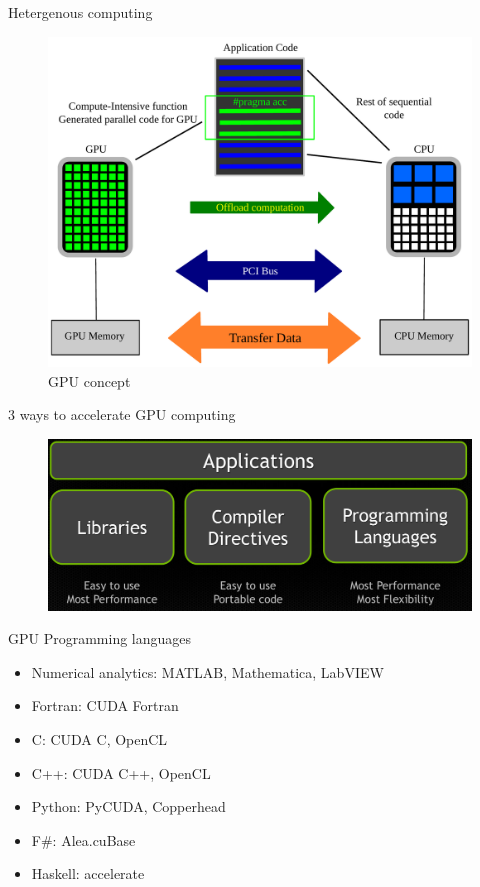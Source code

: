\documentclass[10pt,times]{beamer}
\begin{document}
\begin{frame}{Hetergenous computing}

\begin{figure}
\includegraphics[width=.7\linewidth]{figs/GPU_Concept}
\caption*{GPU concept}
\end{figure}
\end{frame}

\begin{frame}{3 ways to accelerate GPU computing}

\begin{figure}
\includegraphics[width=.7\linewidth]{figs/GPU_3way_acceleration}
\end{figure}
GPU Programming languages
\begin{itemize}
\item Numerical analytics: MATLAB, Mathematica, LabVIEW
\item Fortran: CUDA Fortran
\item C: CUDA C, OpenCL
\item C++: CUDA C++, OpenCL
\item Python: PyCUDA, Copperhead
\item F\#: Alea.cuBase
\item Haskell: accelerate
\end{itemize}
\end{frame}
\end{document}
